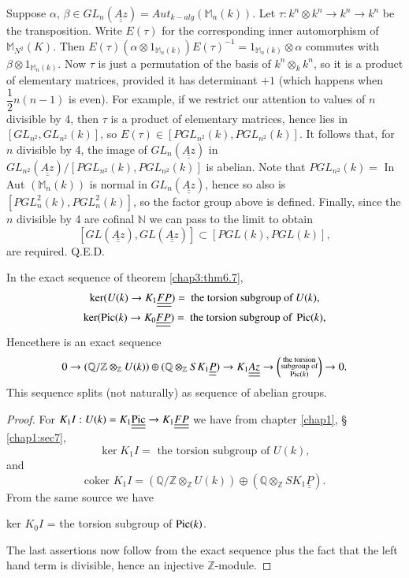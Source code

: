 Suppose $\alpha$, $\beta \in GL_n (\underline{\underline{Az}}) = Aut_{
  k - alg} (\mathbb{M}_n (k))$. Let $\tau : k^n \otimes k^n \to k^n
\to k^n$ be the transposition. Write $E(\tau)$ for the
corresponding\pageoriginale 
inner automorphism of $\mathbb{M}_{N^2} (K)$. Then $E(\tau) (\alpha
\otimes 1_{\mathbb{M}_n (k)}) E(\tau)^{-1} = 1_{\mathbb{M}_n (k)}
\otimes \alpha$ commutes with $\beta \otimes 1_{\mathbb{M}_n
  (k)}$. Now $\tau$ is just a permutation of the basis of $k^n
\otimes_k  k^n $, so it is a product of elementary matrices, provided
it has determinant $+ 1$ (which happens when $\dfrac{1}{2}n (n - 1)$
is even). For example, if we restrict our attention to values of $n$
divisible by 4, then $\tau$ is a product of elementary matrices,
hence lies in $[ GL_{n^2},  GL_{n^2}(k)]$, so $E (\tau) \in [
  PGL_{n^2} (k), PGL_{n^2}(k)]$. It follows that, for $n$ divisible by
4, the image of $GL_n(\underline{\underline{Az}})$ in
$GL_{n^2}(\underline{\underline{Az}}) / [ PGL_{n^2} (k),
  PGL_{n^2}(k)]$ is abelian. Note that $PGL_{n^2} (k ) =$ In Aut
$(\mathbb{M}_n(k))$ is normal in $GL_n(\underline{\underline{Az}})$,
hence so also is $[ PGL_n^2 (k), PGL_n^2 (k)]$, so the factor group
above is defined. Finally, since the $n$ divisible by 4 are cofinal
$\mathbb{N}$ we can pass to the limit to obtain  
$$
[ GL(\underline{\underline{Az}}), GL(\underline{\underline{Az}})]
\subset [ PGL(k), PGL(k)],  
$$
are required.  \hfill{Q.E.D.}

\setcounter{prop}{7}
\begin{prop}%
In the exact sequence of theorem \ref{chap3:thm6.7}, 
\begin{gather*}
\ker (U(k) \to K_1 \underline{\underline{FP}} ) = \text{ the
  torsion subgroup of } U(k), \\ 
\ker (\operatorname{Pic}(k) \to K_0 \underline{\underline{FP}} ) = \text{ the
  torsion subgroup of } \operatorname{Pic}(k),  
\end{gather*}
Hence\pageoriginale there is an exact sequence 
$$
 0 \to (\mathbb{Q} / \mathbb{Z} \otimes_{\mathbb{Z}} U(k))
  \oplus (\mathbb{Q} \otimes_{\mathbb{Z}} SK_1 
 \underline{\underline{P}}) \to K_1 \underline{\underline{Az}} \to
 \left({\substack{\text{the torsion} \\ \text{subgroup
     of} \\ \operatorname{Pic} (k)}}\right) \to 0. 
 $$
  This sequence splits (not naturally) as sequence of abelian groups.  
 \end{prop}

\begin{proof}
For $K_1 I : U(k) = K_1 \underline{\underline{\operatorname{Pic}}} \to K_1
\underline{\underline{FP}}$ we have from chapter \ref{chap1}, \S
\ref{chap1:sec7},   
$$
\ker K_1 I = \text{ the torsion subgroup of } U(k),
$$
and
$$
\text{coker } K_1 I = (\mathbb{Q} / \mathbb{Z} \otimes_{\mathbb{Z}}
U(k)) \oplus (\mathbb{Q} \otimes_{\mathbb{Z}} SK_1
\underline{\underline{P}}). 
$$
From the same source we have 

ker $K_0 I$ =  the torsion subgroup of  $\operatorname{Pic} (k)$. 

The last assertions now follow from the exact sequence plus the fact
that the left hand term is divisible, hence an injective
$\mathbb{Z}$-module.  
\end{proof}

